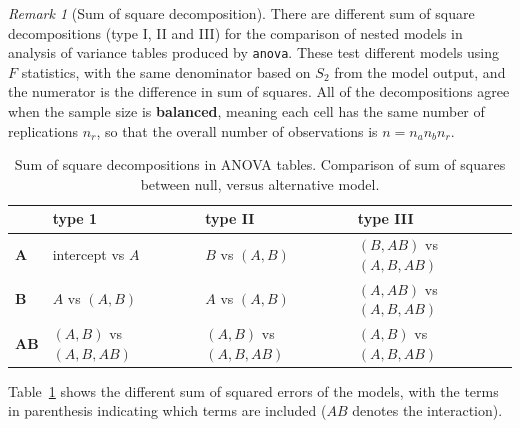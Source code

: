 \documentclass[
  11pt,
  letterpaper,
]{scrbook}
\theoremstyle{plain}
\theoremstyle{definition}
\theoremstyle{definition}
\theoremstyle{plain}
\theoremstyle{remark}
\newtheorem{refremark}{Remark}[chapter]
\begin{document}
\begin{refremark}[Sum of square decomposition]
There are different sum of square decompositions (type I, II and III)
for the comparison of nested models in analysis of variance tables
produced by \texttt{anova}. These test different models using \(F\)
statistics, with the same denominator based on \(S_2\) from the model
output, and the numerator is the difference in sum of squares. All of
the decompositions agree when the sample size is \textbf{balanced},
meaning each cell has the same number of replications \(n_r\), so that
the overall number of observations is \(n = n_an_bn_r\).

\begin{longtable}[]{@{}
  >{\raggedright\arraybackslash}p{}
  >{\raggedright\arraybackslash}p{}
  >{\raggedright\arraybackslash}p{}
  >{\raggedright\arraybackslash}p{}@{}}

\caption{\label{tbl-ssdecompo}Sum of square decompositions in ANOVA
tables. Comparison of sum of squares between null, versus alternative
model.}

\tabularnewline

\toprule\noalign{}
\begin{minipage}[b]{\linewidth}\raggedright
\end{minipage} & \begin{minipage}[b]{\linewidth}\raggedright
type 1
\end{minipage} & \begin{minipage}[b]{\linewidth}\raggedright
type II
\end{minipage} & \begin{minipage}[b]{\linewidth}\raggedright
type III
\end{minipage} \\
\midrule\noalign{}
\endhead
\bottomrule\noalign{}
\endlastfoot
\(\boldsymbol{A}\) & intercept vs \(A\) & \(B\) vs \((A,B)\) &
\((B, AB)\) vs \((A,B, AB)\) \\
\(\boldsymbol{B}\) & \(A\) vs \((A,B)\) & \(A\) vs \((A,B)\) &
\((A, AB)\) vs \((A,B,AB)\) \\
\(\boldsymbol{AB}\) & \((A,B)\) vs \((A,B,AB)\) & \((A,B)\) vs
\((A,B,AB)\) & \((A,B)\) vs \((A,B,AB)\) \\

\end{longtable}

Table~\ref{tbl-ssdecompo} shows the different sum of squared errors of
the models, with the terms in parenthesis indicating which terms are
included (\(AB\) denotes the interaction).


\end{refremark}
\end{document}
